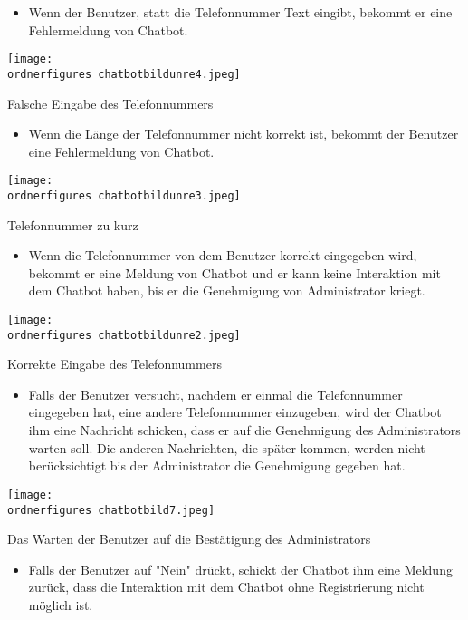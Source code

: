 \newpage
\begin{itemize}
	\item Wenn der Benutzer, statt die Telefonnummer Text eingibt, bekommt er eine Fehlermeldung von Chatbot.
\end{itemize}
\begin{center}
	\captionsetup{type=figure}
	\texttt{[image: \\ordnerfigures chatbotbildunre4.jpeg]}
	\caption{Falsche Eingabe des Telefonnummers}
	\label{fig:chfdsatboregistrfds}
\end{center}
\begin{itemize}
	\item Wenn die L\"ange der Telefonnummer nicht korrekt ist, bekommt der Benutzer eine Fehlermeldung von Chatbot.
\end{itemize}
\begin{center}
	\captionsetup{type=figure}
	\texttt{[image: \\ordnerfigures chatbotbildunre3.jpeg]}
	\caption{Telefonnummer zu kurz}
	\label{fig:crboregistrfds}
\end{center}
\begin{itemize}
	\item Wenn die Telefonnummer von dem Benutzer korrekt eingegeben wird, bekommt er eine Meldung von Chatbot und er kann keine Interaktion mit dem Chatbot haben, bis er die Genehmigung von Administrator kriegt.
\end{itemize}
\begin{center}
	\captionsetup{type=figure}
	\texttt{[image: \\ordnerfigures chatbotbildunre2.jpeg]}
	\caption{Korrekte Eingabe des Telefonnummers}
	\label{fig:crboreistrfds}
\end{center}
\begin{itemize}
	\item Falls der Benutzer versucht, nachdem er einmal die Telefonnummer eingegeben hat, eine andere Telefonnummer einzugeben, wird der Chatbot ihm eine Nachricht schicken, dass er auf die Genehmigung des Administrators warten soll. Die anderen Nachrichten, die später kommen, werden nicht berücksichtigt bis der Administrator die Genehmigung gegeben hat.
\end{itemize}
\begin{center}
	\captionsetup{type=figure}
	\texttt{[image: \\ordnerfigures chatbotbild7.jpeg]}
	\caption{Das Warten der Benutzer auf die Bestätigung des Administrators}
	\label{fig:chat232bo53}
\end{center}
\begin{itemize}
	\item Falls der Benutzer auf "Nein" dr\"uckt, schickt der Chatbot ihm eine Meldung zur\"uck, dass die Interaktion mit dem Chatbot ohne Registrierung nicht m\"oglich ist.
\end{itemize}
